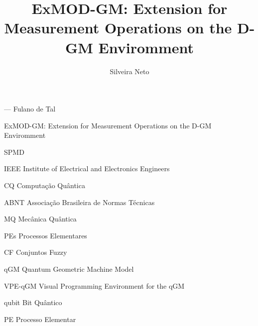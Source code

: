 \documentclass[tcc,capa]{texufpel}
\title{ExMOD-GM: Extension for Measurement Operations on the D-GM Enviromment}
\author{Silveira Neto}{Julio Machado da Silveira Neto}
\begin{document}

\maketitle 

\sloppy

\fichacatalografica

\folhadeaprovacao

\begin{dedicatoria}

\end{dedicatoria}

\begin{agradecimentos}

\end{agradecimentos}

\begin{epigrafe}

  {\sc --- Fulano de Tal}
\end{epigrafe}

\begin{abstract}

\end{abstract}

\begin{englishabstract}%
  {ExMOD-GM: Extension for Measurement Operations on the D-GM Enviromment}%

  

  

\end{englishabstract}

\listoffigures

\listoftables

\begin{listofabbrv}{SPMD}
    \item[IEEE] Institute of Electrical and Electronics Engineers
        \item[CQ] Computação Quântica
        \item[ABNT] Associação Brasileira de Normas Técnicas
        \item[MQ] Mecânica Quântica
        \item[PEs] Processos Elementares
        \item[CF] Conjuntos Fuzzy
        \item[qGM] Quantum Geometric Machine Model
        \item[VPE-qGM] Visual Programming Environment for the qGM
        \item[qubit] Bit Quântico 
        \item[PE] Processo Elementar
\end{listofabbrv}
\end{document}
